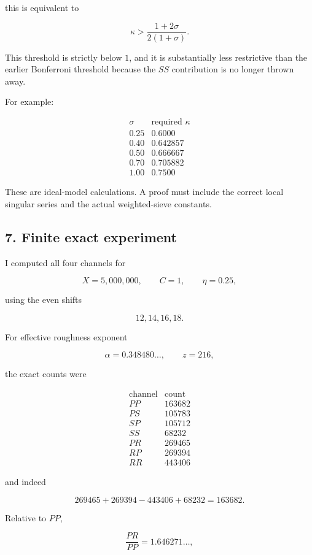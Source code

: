 this is equivalent to

\[
\boxed{
\kappa>
\frac{1+2\sigma}{2(1+\sigma)}.
}
\tag{13}
\]

This threshold is strictly below \(1\), and it is substantially less restrictive than the earlier Bonferroni threshold because the \(SS\) contribution is no longer thrown away.

For example:

\[
\begin{array}{c|c}
\sigma&\text{required }\kappa\\ \hline
0.25&0.6000\\
0.40&0.642857\\
0.50&0.666667\\
0.70&0.705882\\
1.00&0.7500
\end{array}
\]

These are ideal-model calculations. A proof must include the correct local singular series and the actual weighted-sieve constants.

\subsection*{7. Finite exact experiment}

I computed all four channels for

\[
X=5{,}000{,}000,
\qquad
C=1,
\qquad
\eta=0.25,
\]

using the even shifts

\[
12,14,16,18.
\]

For effective roughness exponent

\[
\alpha=0.348480\ldots,\qquad z=216,
\]

the exact counts were

\[
\begin{array}{c|r}
\text{channel}&\text{count}\\ \hline
PP&163682\\
PS&105783\\
SP&105712\\
SS&68232\\
PR&269465\\
RP&269394\\
RR&443406
\end{array}
\]

and indeed

\[
269465+269394-443406+68232
=
163682.
\]

Relative to \(PP\),

\[
\frac{PR}{PP}=1.646271\ldots,
\]

